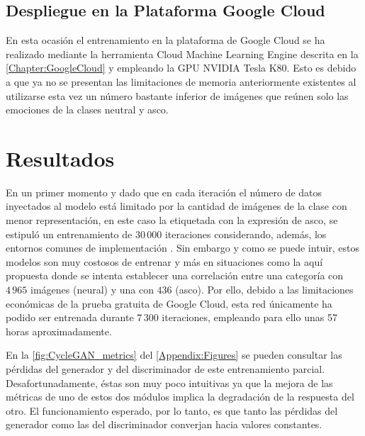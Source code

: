 \subsection{Despliegue en la Plataforma Google Cloud}

En esta ocasión el entrenamiento en la plataforma de Google Cloud se ha realizado mediante la herramienta Cloud Machine Learning Engine descrita en la \autoref{Chapter:GoogleCloud} y empleando la GPU NVIDIA Tesla K80. Esto es debido a que ya no se presentan las limitaciones de memoria anteriormente existentes al utilizarse esta vez un número bastante inferior de imágenes que reúnen solo las emociones de la clases neutral y asco.

\section{Resultados}

En un primer momento y dado que en cada iteración el número de datos inyectados al modelo está limitado por la cantidad de imágenes de la clase con menor representación, en este caso la etiquetada con la expresión de asco, se estipuló un entrenamiento de $30\,000$ iteraciones considerando, además, los entornos comunes de implementación \cite{RSGAN}. Sin embargo y como se puede intuir, estos modelos son muy costosos de entrenar y más en situaciones como la aquí propuesta donde se intenta establecer una correlación entre una categoría con $4\,965$ imágenes (neural) y una con $436$ (asco). Por ello, debido a las limitaciones económicas de la prueba gratuita de Google Cloud, esta red únicamente ha podido ser entrenada durante $7\,300$ iteraciones, empleando para ello unas 57 horas aproximadamente.

En la \autoref{fig:CycleGAN_metrics} del \autoref{Appendix:Figures} se pueden consultar las pérdidas del generador y del discriminador de este entrenamiento parcial. Desafortunadamente, éstas son muy poco intuitivas ya que la mejora de las métricas de uno de estos dos módulos implica la degradación de la respuesta del otro. El funcionamiento esperado, por lo tanto, es que tanto las pérdidas del generador como las del discriminador converjan hacia valores constantes.


